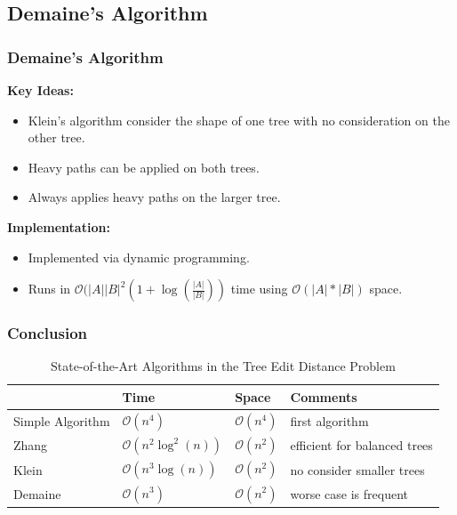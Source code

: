 \documentclass{beamer}
\begin{document}
\subsection{Demaine's Algorithm}
\begin{frame}
\frametitle{Demaine's Algorithm}
\textbf{Key Ideas:}
\begin{itemize}
\item Klein's algorithm consider the shape of one tree with no consideration on the other tree.
\item Heavy paths can be applied on both trees. 
\item Always applies heavy paths on the larger tree. 
\end{itemize}
\textbf{Implementation:}
\begin{itemize}
\item Implemented via dynamic programming.
\item Runs in $\mathcal{O}(\left\vert A \right\vert \left\vert B \right\vert ^ 2(1 + \log(\frac{\left\vert A \right\vert}{\left\vert B \right\vert}))$ time using $\mathcal{O}(\left\vert A \right\vert * \left\vert B \right\vert)$ space.
\end{itemize}
\end{frame}
\begin{frame}
\frametitle{Conclusion}
\begin{table}
			\centering
			\begin{tabular}{l l l l}
				\toprule
				\textbf{} & \textbf{Time} & \textbf{Space} & \textbf{Comments}\\

				\midrule
				Simple Algorithm &  $\mathcal{O}(n^4)$ & $\mathcal{O}(n^4)$ & first algorithm\\
				Zhang & $\mathcal{O}(n^2\log^2(n))$ & $\mathcal{O}(n^2)$ & efficient for balanced trees \\
				Klein &  $\mathcal{O}(n^3\log(n))$ & $\mathcal{O}(n^2)$ &  no consider smaller trees\\
				Demaine &  $\mathcal{O}(n^3)$ & $\mathcal{O}(n^2)$ & worse case is frequent\\
			\end{tabular}
		\caption{State-of-the-Art Algorithms in the Tree Edit Distance Problem}
\end{table}
\end{frame}
\end{document}
